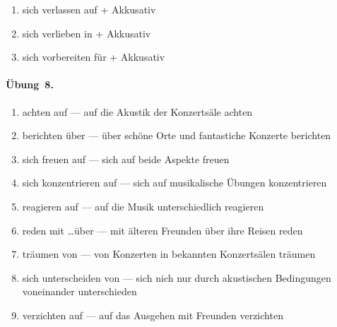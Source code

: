 \begin{enumerate}
    \item sich verlassen auf + Akkusativ
    \item sich verlieben in + Akkusativ
    \item sich vorbereiten für + Akkusativ
\end{enumerate}
\paragraph*{Übung~8.}
\begin{enumerate}
    \item achten auf --- auf die Akustik der Konzertsäle achten
    \item berichten über --- über schöne Orte und fantastiche Konzerte berichten
    \item sich freuen auf --- sich auf beide Aspekte freuen
    \item sich konzentrieren auf --- sich auf musikalische Übungen konzentrieren
    \item reagieren auf --- auf die Musik unterschiedlich reagieren
    \item reden mit \ldots über --- mit älteren Freunden über ihre Reisen reden
    \item träumen von --- von Konzerten in bekannten Konzertsälen träumen
    \item sich unterscheiden von --- sich nich nur durch akustischen Bedingungen voneinander unterschieden
    \item verzichten auf --- auf das Ausgehen mit Freunden verzichten
\end{enumerate}
